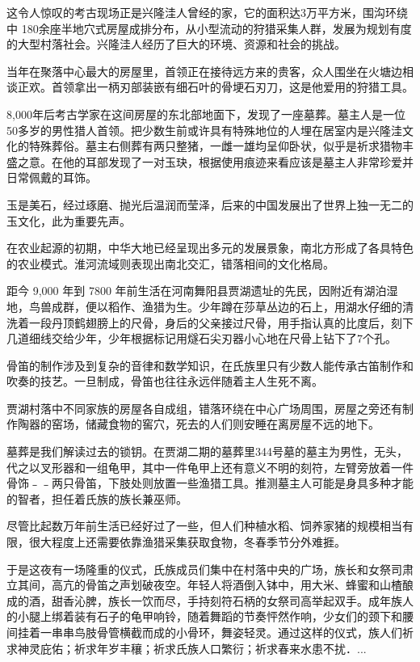 这令人惊叹的考古现场正是兴隆洼人曾经的家，它的面积达3万平方米，围沟环绕中 180余座半地穴式房屋成排分布，从小型流动的狩猎采集人群，发展为规划有度的大型村落社会。兴隆洼人经历了巨大的环境、资源和社会的挑战。

当年在聚落中心最大的房屋里，首领正在接待远方来的贵客，众人围坐在火塘边相谈正欢。首领拿出一柄刃部装嵌有细石叶的骨埂石刃刀，这是他爱用的狩猎工具。

8,000年后考古学家在这间房屋的东北部地面下，发现了一座墓葬。墓主人是一位50多岁的男性猎人首领。把少数生前或许具有特殊地位的人埋在居室内是兴隆洼文化的特殊葬俗。墓主右侧葬有两只整猪，一雌一雄均呈仰卧状，似乎是祈求猎物丰盛之意。在他的耳部发现了一对玉玦，根据使用痕迹来看应该是墓主人非常珍爱并日常佩戴的耳饰。

玉是美石，经过琢磨、抛光后温润而莹泽，后来的中国发展出了世界上独一无二的玉文化，此为重要先声。

在农业起源的初期，中华大地已经呈现出多元的发展景象，南北方形成了各具特色的农业模式。淮河流域则表现出南北交汇，错落相间的文化格局。

距今 9,000 年到 7800 年前生活在河南舞阳县贾湖遗址的先民，因附近有湖泊湿地，鸟兽成群，便以稻作、渔猎为生。少年蹲在莎草丛边的石上，用湖水仔细的清洗着一段丹顶鹤翅膀上的尺骨，身后的父亲接过尺骨，用手指认真的比度后，刻下几道细线交给少年，少年根据标记用燧石尖刃器小心地在尺骨上钻下了7个孔。

骨笛的制作涉及到复杂的音律和数学知识，在氏族里只有少数人能传承古笛制作和吹奏的技艺。一旦制成，骨笛也往往永远伴随着主人生死不离。

贾湖村落中不同家族的房屋各自成组，错落环绕在中心广场周围，房屋之旁还有制作陶器的窑场，储藏食物的窖穴，死去的人们则安睡在离房屋不远的地下。

墓葬是我们解读过去的锁钥。在贾湖二期的墓葬里344号墓的墓主为男性，无头，代之以叉形器和一组龟甲，其中一件龟甲上还有意义不明的刻符，左臂旁放着一件骨饰﹣﹣两只骨笛，下肢处则放置一些渔猎工具。推测墓主人可能是身具多种才能的智者，担任着氏族的族长兼巫师。

尽管比起数万年前生活已经好过了一些，但人们种植水稻、饲养家猪的规模相当有限，很大程度上还需要依靠渔猎采集获取食物，冬春季节分外难捱。

于是这夜有一场隆重的仪式，氏族成员们集中在村落中央的广场，族长和女祭司肃立其间，高亢的骨笛之声划破夜空。年轻人将酒倒入钵中，用大米、蜂蜜和山楂酿成的酒，甜香沁脾，族长一饮而尽，手持刻符石柄的女祭司高举起双手。成年族人的小腿上绑着装有石子的龟甲响铃，随着舞蹈的节奏怦然作响，少女们的颈下和腰间挂着一串串鸟肢骨管横截而成的小骨环，舞姿轻灵。通过这样的仪式，族人们祈求神灵庇佑；祈求年岁丰穰；祈求氏族人口繁衍；祈求春来水患不扰．...

